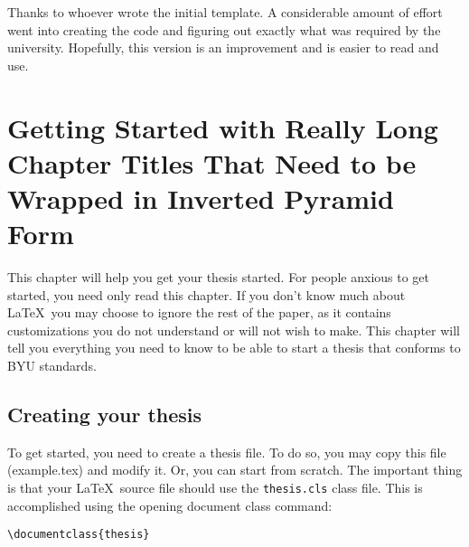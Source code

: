 \documentclass[12pt]{thesis}
\begin{document}
\begin{acknowledgements}
\qquad Thanks to whoever wrote the initial template. A considerable amount of effort went into creating the code and figuring out exactly what was required by the university. Hopefully, this version is an improvement and is easier to read and use.
\end{acknowledgements}


% 

\tableofcontents
\listoftables
\listoffigures

\mainmatter

\chapter{Getting Started with Really Long Chapter Titles That Need to be Wrapped in Inverted Pyramid Form}
This chapter will help you get your thesis started. For people anxious to get started, you need only read this chapter. If you don't know much about \LaTeX\ you may choose to ignore the rest of the paper, as it contains customizations you do not understand or will not wish to make. This chapter will tell you everything you need to know to be able to start a thesis that conforms to BYU standards.

\section{Creating your thesis}
To get started, you need to create a thesis file. To do so, you may copy this file (example.tex) and modify it. Or, you can start from scratch. The important thing is that your \LaTeX\ source file should use the \texttt{thesis.cls} class file. This is accomplished using the opening document class command:
\begin{verbatim}
\documentclass{thesis}
\end{verbatim}
\end{document}
